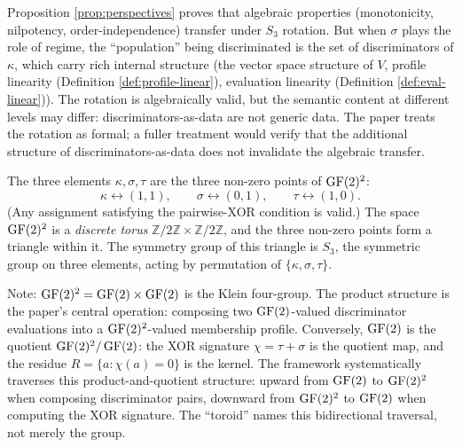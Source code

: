 \begin{remark}
Proposition \ref{prop:perspectives} proves that algebraic
properties (monotonicity, nilpotency, order-independence)
transfer under $S_3$ rotation. But when $\sigma$ plays
the role of regime, the ``population'' being discriminated
is the set of discriminators of $\kappa$, which carry
rich internal structure (the vector space structure of $V$,
profile linearity (Definition \ref{def:profile-linear}), evaluation linearity (Definition \ref{def:eval-linear})). The rotation is
algebraically valid, but the semantic content at different
levels may differ: discriminators-as-data are not generic
data. The paper treats the rotation as formal; a fuller
treatment would verify that the additional structure of
discriminators-as-data does not invalidate the algebraic
transfer.
\end{remark}

\begin{definition}[$\GF(2)$ toroid]\label{def:toroid}
The three elements $\kappa, \sigma, \tau$ are the three
non-zero points of $\operatorname{GF}(2)^2$:
\[
  \kappa \leftrightarrow (1,1), \qquad
  \sigma \leftrightarrow (0,1), \qquad
  \tau   \leftrightarrow (1,0).
\]
(Any assignment satisfying the pairwise-XOR condition is
valid.) The space $\operatorname{GF}(2)^2$ is a \emph{discrete torus}
$\mathbb{Z}/2\mathbb{Z} \times \mathbb{Z}/2\mathbb{Z}$,
and the three non-zero points form a triangle within it.
The symmetry group of this triangle is $S_3$, the
symmetric group on three elements, acting by permutation
of $\{\kappa, \sigma, \tau\}$.

Note: $\operatorname{GF}(2)^2 = \operatorname{GF}(2) \times \operatorname{GF}(2)$ is the Klein
four-group. The product structure is the paper's
central operation: composing two $\GF(2)$-valued
discriminator evaluations into a $\operatorname{GF}(2)^2$-valued
membership profile. Conversely, $\GF(2)$ is the
quotient $\operatorname{GF}(2)^2 / \operatorname{GF}(2)$: the XOR signature
$\chi = \tau + \sigma$ is the quotient map, and the
residue $R = \{a : \chi(a) = 0\}$ is the kernel.
The framework systematically traverses this
product-and-quotient structure: upward from $\GF(2)$
to $\operatorname{GF}(2)^2$ when composing discriminator pairs,
downward from $\operatorname{GF}(2)^2$ to $\GF(2)$ when computing
the XOR signature. The ``toroid'' names this
bidirectional traversal, not merely the group.
\end{definition}

